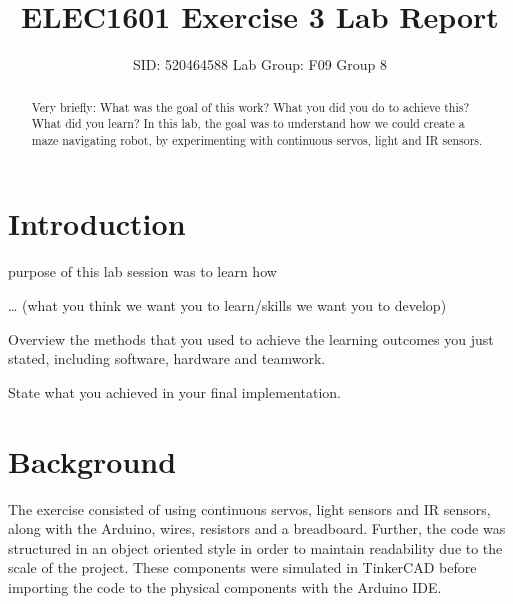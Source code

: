 \documentclass[journal]{IEEEtran}
\begin{document}
\title{ELEC1601 Exercise 3 Lab Report}

\author{SID: 520464588 Lab Group: F09 Group 8}

\maketitle


\begin{abstract}
Very briefly: What was the goal of this work? What you did you do to achieve this? What did you learn?
In this lab, the goal was to understand how we could create a maze navigating robot, by experimenting with  continuous servos, light and IR sensors. 
\end{abstract}


\section{Introduction}

 purpose of this lab session was to learn how 

… (what you think we want you to learn/skills we want you to develop)

Overview the methods that you used to achieve the learning outcomes you just stated, including software, hardware and teamwork.

State what  you achieved in your final implementation.

\section{Background}
The exercise consisted of using continuous servos, light sensors and IR sensors, along with the Arduino, wires, resistors and a breadboard. Further, the code was structured in an object oriented style in order to maintain readability due to the scale of the project. These components were simulated in TinkerCAD before importing the code to the physical components with the Arduino IDE.
\end{document}
